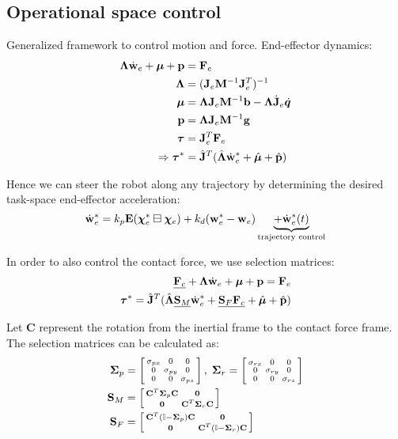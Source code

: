 \documentclass[a4paper, 8pt]{extarticle}
\begin{document}
\begin{multicols*}{3}
\subsection*{Operational space control}
Generalized framework to control motion and force. End-effector dynamics:
\begin{align*}
\bm\Lambda \dot{\bf w}_e + \bm\mu + {\bf p} &= {\bf F}_e  \\
\bm\Lambda &= ({\bf J}_e{\bf M}^{-1}{\bf J}_e^T)^{-1} \\
\bm\mu     &= {\bm\Lambda}{\bf J}_e{\bf M}^{-1}{\bf b} - {\bm\Lambda}\dot{\bf J}_e\dot{\bm q} \\
{\bf p}    &= {\bm\Lambda}{\bf J}_e{\bf M}^{-1}{\bf g} \\
\bm\tau    &= {\bf J}_e^T{\bf F}_e\\
\Rightarrow \bm\tau^* &= \hat{\bf J}^T(\hat{\bm\Lambda} \dot{\bf w}_e^* + \hat{\bm\mu} + \hat{\bf p})
\end{align*}

Hence we can steer the robot along any trajectory by determining the desired task-space end-effector acceleration:
$$\dot{\bf w}_e^* = k_p{\bf E}(\bm\chi^*_e \boxminus \bm\chi_e) + k_d({\bf w}_e^* - {\bf w}_e) \underbrace{+ \dot{\bf w}_e^*(t)}_\text{trajectory control} $$

In order to also control the contact force, we use selection matrices:
\begin{align*}
\underline{{\bf F}_c} + \bm\Lambda \dot{\bf w}_e + \bm\mu + {\bf p} = {\bf F}_e \\
\bm\tau^* = \hat{\bf J}^T(\hat{\bm\Lambda} \underline{{\bf S}_M} \dot{\bf w}_e^* + \underline{{\bf S}_F{\bf F}_c} + \hat{\bm\mu} + \hat{\bf p})
\end{align*}

Let {\bf C} represent the rotation from the inertial frame to the contact force frame. The selection matrices can be calculated as:
\begin{align*}
\bm\Sigma_p &= \left[\begin{smallmatrix}
\sigma_{px} & 0 & 0 \\
0 & \sigma_{py} & 0 \\
0 & 0 & \sigma_{pz} \end{smallmatrix}\right], \;
\bm\Sigma_r = \left[\begin{smallmatrix}
\sigma_{rx} & 0 & 0 \\
0 & \sigma_{ry} & 0 \\
0 & 0 & \sigma_{rz} \end{smallmatrix}\right] \\
{\bf S}_M &= \left[\begin{smallmatrix}
{\bf C}^T\bm\Sigma_p{\bf C} & {\bf 0} \\
{\bf 0}  &  {\bf C}^T\bm\Sigma_r{\bf C}
\end{smallmatrix}\right]\\
{\bf S}_F &= \left[\begin{smallmatrix}
{\bf C}^T(\mathbb I - \bm\Sigma_p) {\bf C} & {\bf 0} \\
{\bf 0}  &  {\bf C}^T(\mathbb I - \bm\Sigma_r) {\bf C}
\end{smallmatrix}\right]
\end{align*}



\end{multicols*}
\end{document}
